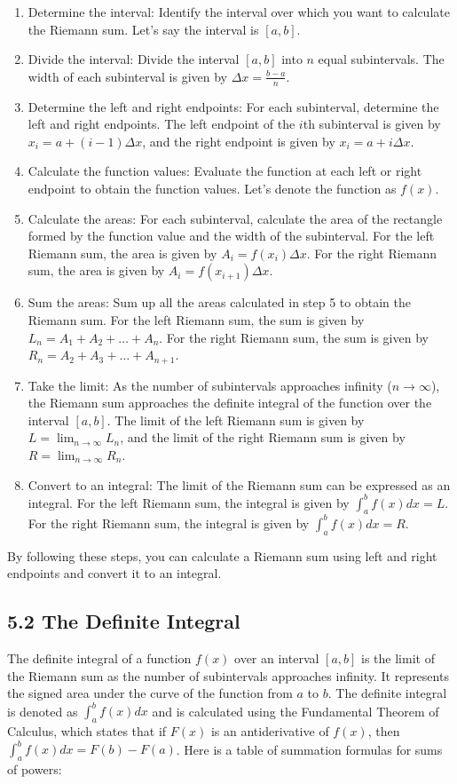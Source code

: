 \documentclass{article}
\begin{document}
\begin{enumerate}
\item Determine the interval: Identify the interval over which you want to calculate the Riemann sum. Let's say the interval is $[a, b]$.
\item Divide the interval: Divide the interval $[a, b]$ into $n$ equal subintervals. The width of each subinterval is given by $\Delta x = \frac{b - a}{n}$.
\item Determine the left and right endpoints: For each subinterval, determine the left and right endpoints. The left endpoint of the $i$th subinterval is given by $x_i = a + (i - 1)\Delta x$, and the right endpoint is given by $x_i = a + i\Delta x$.
\item Calculate the function values: Evaluate the function at each left or right endpoint to obtain the function values. Let's denote the function as $f(x)$.
\item Calculate the areas: For each subinterval, calculate the area of the rectangle formed by the function value and the width of the subinterval. For the left Riemann sum, the area is given by $A_i = f(x_i)\Delta x$. For the right Riemann sum, the area is given by $A_i = f(x_{i+1})\Delta x$.
\item Sum the areas: Sum up all the areas calculated in step 5 to obtain the Riemann sum. For the left Riemann sum, the sum is given by $L_n = A_1 + A_2 + \ldots + A_n$. For the right Riemann sum, the sum is given by $R_n = A_2 + A_3 + \ldots + A_{n+1}$.
\item Take the limit: As the number of subintervals approaches infinity ($n \rightarrow \infty$), the Riemann sum approaches the definite integral of the function over the interval $[a, b]$. The limit of the left Riemann sum is given by $L = \lim_{n \rightarrow \infty} L_n$, and the limit of the right Riemann sum is given by $R = \lim_{n \rightarrow \infty} R_n$.
\item Convert to an integral: The limit of the Riemann sum can be expressed as an integral. For the left Riemann sum, the integral is given by $\int_{a}^{b} f(x) dx = L$. For the right Riemann sum, the integral is given by $\int_{a}^{b} f(x) dx = R$.
\end{enumerate}

By following these steps, you can calculate a Riemann sum using left and right endpoints and convert it to an integral.


\subsection{5.2 The Definite Integral}
The definite integral of a function $f(x)$ over an interval $[a, b]$ is the limit of the Riemann sum as the number of subintervals approaches infinity. It represents the signed area under the curve of the function from $a$ to $b$. The definite integral is denoted as $\int_{a}^{b} f(x) dx$ and is calculated using the Fundamental Theorem of Calculus, which states that if $F(x)$ is an antiderivative of $f(x)$, then $\int_{a}^{b} f(x) dx = F(b) - F(a)$.
Here is a table of summation formulas for sums of powers:
\end{document}
